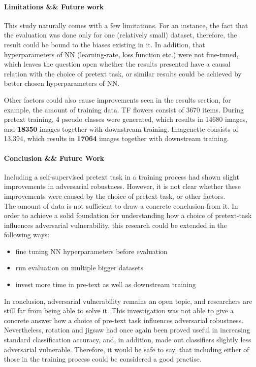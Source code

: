 \paragraph{Limitations \&\& Future work}
This study naturally comes with a few limitations.
For an instance, the fact that the evaluation was done only for one (relatively small) dataset,
therefore, the result could be bound to the biases existing in it.
In addition, that hyperparameters of NN (learning-rate, loss function etc.)
were not fine-tuned, which leaves the question open whether the
results presented have a causal relation with the choice of pretext task,
or similar results could be achieved by better chosen hyperparameters of NN.

Other factors could also cause improvements seen in the results section, for example, the amount of training data.
TF flowers consist of 3670 items.
During pretext training, 4 pseudo classes were generated,
which results in 14680 images, and \textbf{18350} images together with downstream training.
Imagenette consists of 13,394, which results in \textbf{17064} images together with downstream training.



\paragraph{Conclusion \&\& Future Work}
Including a self-supervised pretext task in a training process had shown slight improvements in adversarial robustness.
However, it is not clear whether these improvements were caused by the choice of pretext task, or other factors.
\\
The amount of data is not sufficient to draw a concrete conclusion from it.
In order to achieve a solid foundation for understanding how a choice of pretext-task influences adversarial vulnerability,
this research could be extended in the following ways:
\begin{itemize}
    \item fine tuning NN hyperparameters before evaluation
    \item run evaluation on multiple bigger datasets
    \item invest more time in pre-text as well as downstream training
\end{itemize}


In conclusion, adversarial vulnerability remains an open topic,
and researchers are still far from being able to solve it.
This investigation was not able to give a concrete answer
how a choice of pre-text task influences adversarial robustness.
\\
Nevertheless, rotation and jigsaw had once again been proved useful in increasing standard classification accuracy,
and, in addition, made out classifiers slightly less adversarial vulnerable.
Therefore, it would be safe to say,
that including either of those in the training process could be considered a good practise.


